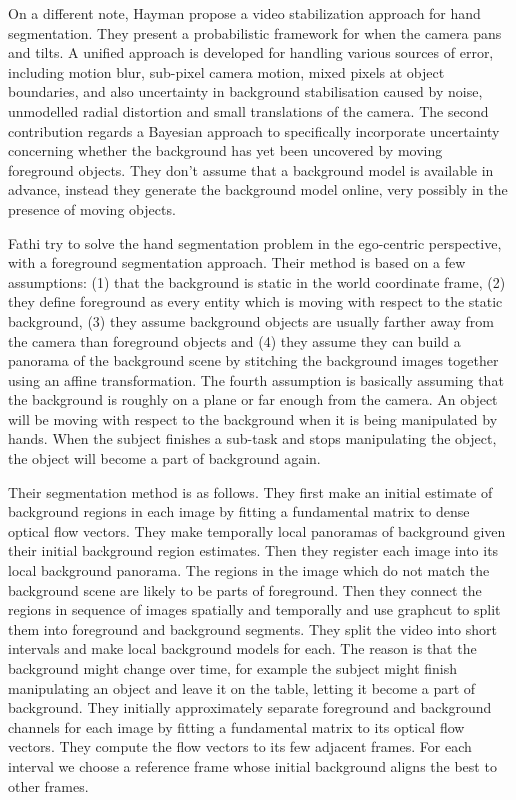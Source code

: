 On a different note, Hayman \etal \cite{hayman03} propose a video stabilization approach for hand segmentation. They present a probabilistic
framework for when the camera pans and tilts. A unified approach is developed for handling various sources of error, including motion blur, sub-pixel camera motion, mixed pixels at object boundaries, and also uncertainty in background stabilisation caused by noise, unmodelled radial distortion and small translations of the camera. The second contribution regards a Bayesian approach to
specifically incorporate uncertainty concerning whether the background has yet been uncovered by moving foreground
objects. They don't assume that a background model is available in advance, instead they generate the background model online, very possibly in the presence of moving objects.

Fathi \etal \cite{fathi11} try to solve the hand segmentation problem in the ego-centric perspective, with a foreground segmentation approach. Their method is based on a few
assumptions: (1) that the background
is static in the world coordinate frame, (2) they define foreground
as every entity which is moving with respect to the
static background, (3) they assume background objects are
usually farther away from the camera than foreground objects
and (4) they assume they can build a panorama of the background scene by stitching the background images together
using an affine transformation. The fourth assumption
is basically assuming that the background is roughly
on a plane or far enough from the camera. An object will
be moving with respect to the background when it is being
manipulated by hands. When the subject finishes a sub-task
and stops manipulating the object, the object will become a
part of background again.

Their segmentation method is as follows. They first make an
initial estimate of background regions in each image by fitting
a fundamental matrix to dense optical flow vectors. They
make temporally local panoramas of background given their
initial background region estimates. Then they register each
image into its local background panorama. The regions in
the image which do not match the background scene are
likely to be parts of foreground. Then they connect the regions in
sequence of images spatially and temporally and use graphcut
to split them into foreground and background segments.
They split the video into short intervals and make local
background models for each. The reason is that the background
might change over time, for example the subject
might finish manipulating an object and leave it on the table,
letting it become a part of background. They initially approximately
separate foreground and background channels
for each image by fitting a fundamental matrix to its optical
flow vectors. They compute the flow vectors to its few adjacent
frames. For each interval we choose a reference frame
whose initial background aligns the best to other frames.

